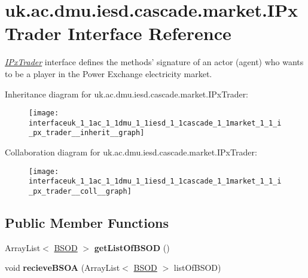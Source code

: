\hypertarget{interfaceuk_1_1ac_1_1dmu_1_1iesd_1_1cascade_1_1market_1_1_i_px_trader}{\section{uk.\-ac.\-dmu.\-iesd.\-cascade.\-market.\-I\-Px\-Trader Interface Reference}
\label{interfaceuk_1_1ac_1_1dmu_1_1iesd_1_1cascade_1_1market_1_1_i_px_trader}
}


{\itshape \hyperlink{interfaceuk_1_1ac_1_1dmu_1_1iesd_1_1cascade_1_1market_1_1_i_px_trader}{I\-Px\-Trader}} interface defines the methods' signature of an actor (agent) who wants to be a player in the {\ttfamily Power Exchange} electricity market.  




Inheritance diagram for uk.\-ac.\-dmu.\-iesd.\-cascade.\-market.\-I\-Px\-Trader\-:\nopagebreak
\begin{figure}[H]
\begin{center}
\leavevmode
\texttt{[image: interfaceuk\_1\_1ac\_1\_1dmu\_1\_1iesd\_1\_1cascade\_1\_1market\_1\_1\_i\_px\_trader\_\_inherit\_\_graph]}
\end{center}
\end{figure}


Collaboration diagram for uk.\-ac.\-dmu.\-iesd.\-cascade.\-market.\-I\-Px\-Trader\-:\nopagebreak
\begin{figure}[H]
\begin{center}
\leavevmode
\texttt{[image: interfaceuk\_1\_1ac\_1\_1dmu\_1\_1iesd\_1\_1cascade\_1\_1market\_1\_1\_i\_px\_trader\_\_coll\_\_graph]}
\end{center}
\end{figure}
\subsection*{Public Member Functions}
\begin{DoxyCompactItemize}
\item 
\hypertarget{interfaceuk_1_1ac_1_1dmu_1_1iesd_1_1cascade_1_1market_1_1_i_px_trader_ad4e059197498f6a5b71c885cdebbd80e}{Array\-List$<$ \hyperlink{classuk_1_1ac_1_1dmu_1_1iesd_1_1cascade_1_1market_1_1data_1_1_b_s_o_d}{B\-S\-O\-D} $>$ {\bfseries get\-List\-Of\-B\-S\-O\-D} ()}\label{interfaceuk_1_1ac_1_1dmu_1_1iesd_1_1cascade_1_1market_1_1_i_px_trader_ad4e059197498f6a5b71c885cdebbd80e}

\item 
\hypertarget{interfaceuk_1_1ac_1_1dmu_1_1iesd_1_1cascade_1_1market_1_1_i_px_trader_aaf9da2ccfa8d113c7a12c77ce075282c}{void {\bfseries recieve\-B\-S\-O\-A} (Array\-List$<$ \hyperlink{classuk_1_1ac_1_1dmu_1_1iesd_1_1cascade_1_1market_1_1data_1_1_b_s_o_d}{B\-S\-O\-D} $>$ list\-Of\-B\-S\-O\-D)}\label{interfaceuk_1_1ac_1_1dmu_1_1iesd_1_1cascade_1_1market_1_1_i_px_trader_aaf9da2ccfa8d113c7a12c77ce075282c}

\end{DoxyCompactItemize}


